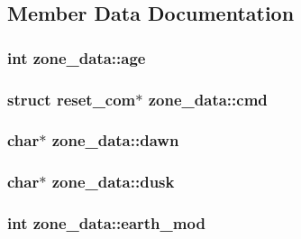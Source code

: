 \subsection{Member Data Documentation}
\hypertarget{structzone__data_a2bf69f347f8b44b42e9764adfae64c05}{
\subsubsection[{age}]{\setlength{\rightskip}{0pt plus 5cm}int zone\-\_\-data\-::age}}\label{structzone__data_a2bf69f347f8b44b42e9764adfae64c05}
\hypertarget{structzone__data_af2c89353f1a217211fd7b77902a268e8}{
\subsubsection[{cmd}]{\setlength{\rightskip}{0pt plus 5cm}struct {\bf reset\-\_\-com}$\ast$ zone\-\_\-data\-::cmd}}\label{structzone__data_af2c89353f1a217211fd7b77902a268e8}
\hypertarget{structzone__data_ad5bab9b03ac5514d88fd0485a9e3cd3f}{
\subsubsection[{dawn}]{\setlength{\rightskip}{0pt plus 5cm}char$\ast$ zone\-\_\-data\-::dawn}}\label{structzone__data_ad5bab9b03ac5514d88fd0485a9e3cd3f}
\hypertarget{structzone__data_aeaf3002524c4db2a3b9f21088bb5be4e}{
\subsubsection[{dusk}]{\setlength{\rightskip}{0pt plus 5cm}char$\ast$ zone\-\_\-data\-::dusk}}\label{structzone__data_aeaf3002524c4db2a3b9f21088bb5be4e}
\hypertarget{structzone__data_addc799fff91eea2134a40f0cddc3af5b}{
\subsubsection[{earth\-\_\-mod}]{\setlength{\rightskip}{0pt plus 5cm}int zone\-\_\-data\-::earth\-\_\-mod}}\label{structzone__data_addc799fff91eea2134a40f0cddc3af5b}

